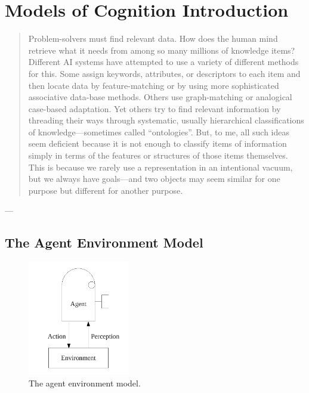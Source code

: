 \chapter{Models of Cognition Introduction}\label{ch:models_of_cognition_introduction}

\begin{quote}
Problem-solvers must find relevant data.  How does the human mind
retrieve what it needs from among so many millions of knowledge items?
Different AI systems have attempted to use a variety of different
methods for this.  Some assign keywords, attributes, or descriptors to
each item and then locate data by feature-matching or by using more
sophisticated associative data-base methods.  Others use
graph-matching or analogical case-based adaptation.  Yet others try to
find relevant information by threading their ways through systematic,
usually hierarchical classifications of knowledge---sometimes called
``ontologies''.  But, to me, all such ideas seem deficient because it
is not enough to classify items of information simply in terms of the
features or structures of those items themselves.  This is because we
rarely use a representation in an intentional vacuum, but we always
have goals---and two objects may seem similar for one purpose but
different for another purpose.
\end{quote}
\begin{flushright}
 --- 
\end{flushright}

\section{The Agent Environment Model}

\begin{figure}[bth]
  \center
  \includegraphics[height=5cm]{gfx/agent_environment}
  \caption[The agent environment model]{The agent environment model.}
  \label{fig:agent_environment}
\end{figure}

